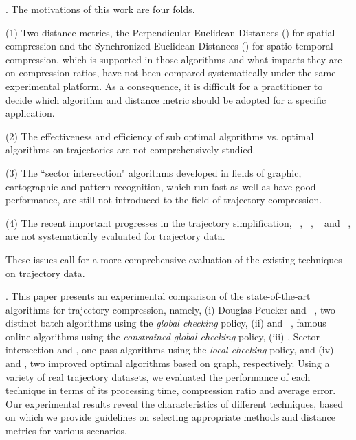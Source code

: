 . The motivations of this work are four folds.

\ni (1) Two distance metrics, \ie the Perpendicular Euclidean Distances (\ped) for spatial compression and the Synchronized Euclidean Distances (\sed)\cite{Meratnia:Spatiotemporal} for spatio-temporal compression, which is supported in those algorithms and what impacts they are on compression ratios, have not been compared systematically under the same experimental platform. As a consequence, it is difficult for a practitioner to decide which algorithm and distance metric should be adopted for a specific application.

\ni (2) The effectiveness and efficiency of sub optimal \lsa algorithms vs. optimal \lsa algorithms on trajectories are not comprehensively studied.

\ni (3) The ``sector intersection" algorithms\cite{Williams:Longest, Sklansky:Cone, Dunham:Cone, Zhao:Sleeve} developed in fields of graphic, cartographic and pattern recognition, which run fast as well as have good performance, are still not introduced to the field of trajectory compression.

\ni (4) The recent important progresses in the trajectory simplification, \ie \squish~\cite{Muckell:Compression}, \bqsa~\cite{Liu:BQS}, \operb~\cite{Lin:Operb} and \cia~\cite{Lin:Cised}, are not systematically evaluated for trajectory data. 




These issues call for a more comprehensive evaluation of the existing \lsa techniques on trajectory data.

\stitle{\textcolor[rgb]{0.00,0.07,1.00}{Contributions \& Roadmap}}.
This paper presents an experimental comparison of the state-of-the-art \lsa algorithms for trajectory compression, namely,
(i) Douglas-Peucker\cite{Douglas:Peucker,Meratnia:Spatiotemporal} and \pavlidis~\cite{Pavlidis:Segment}, two distinct batch \lsa algorithms using the \emph{global checking} policy,
(ii) \bqsa\cite{Liu:BQS} and \squishe~\cite{Muckell:SQUISH}, famous online \lsa algorithms using the \emph{constrained global checking} policy,
(iii) \operb\cite{Lin:Operb}, Sector intersection\cite{Williams:Longest,Sklansky:Cone,Dunham:Cone, Zhao:Sleeve} and \cised \cite{Lin:Cised}, one-pass \lsa algorithms using the \emph{local checking} policy, and
(iv) \oped\cite{Chan:Optimal} and \osed, two improved optimal \lsa algorithms based on graph, respectively.
%
Using a variety of real trajectory datasets, we evaluated the performance of each technique in terms of its processing time, compression ratio and average error.
Our experimental results reveal the characteristics of different techniques, based on which we provide guidelines on selecting appropriate methods and distance metrics for various scenarios.

